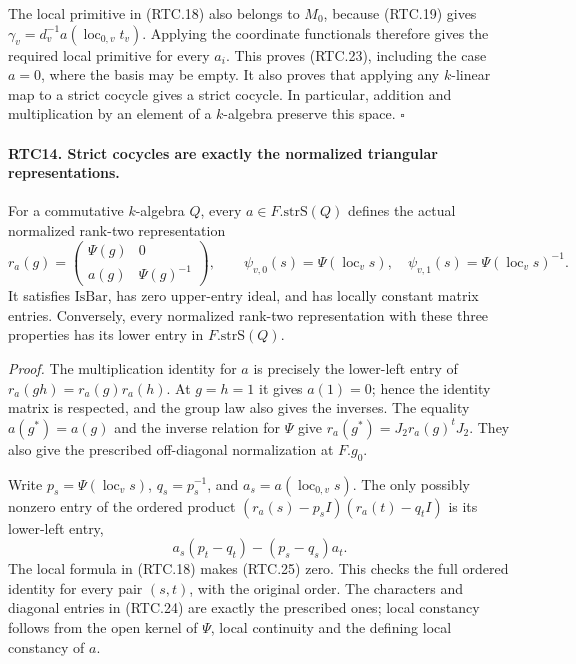 The local primitive in (RTC.18) also belongs to \(M_0\), because
(RTC.19) gives
\(\gamma_v=d_v^{-1}a(\operatorname{loc}_{0,v}t_v)\).
Applying the coordinate functionals therefore gives the required
local primitive for every \(a_i\).  This proves (RTC.23), including
the case \(a=0\), where the basis may be empty.  It also proves
that applying any \(k\)-linear map to a strict cocycle gives a
strict cocycle.  In particular, addition and multiplication by an
element of a \(k\)-algebra preserve this space. \hfill\(\square\)

\paragraph{RTC14. Strict cocycles are exactly the normalized triangular representations.}
\label{claim:RTC14}
For a commutative \(k\)-algebra \(Q\), every
\(a\in F.\mathrm{strS}(Q)\) defines the actual normalized
rank-two representation
\[
 r_a(g)=
 \begin{pmatrix}\Psi(g)&0\\a(g)&\Psi(g)^{-1}\end{pmatrix},
 \qquad
 \psi_{v,0}(s)=\Psi(\operatorname{loc}_v s),\quad
 \psi_{v,1}(s)=\Psi(\operatorname{loc}_v s)^{-1}.
                                                        \tag{RTC.24}
\]
It satisfies \(\mathrm{IsBar}\), has zero upper-entry ideal,
and has locally constant matrix entries.  Conversely, every normalized
rank-two representation with these three properties has its lower
entry in \(F.\mathrm{strS}(Q)\).

\emph{Proof.}
The multiplication identity for \(a\) is precisely the lower-left
entry of \(r_a(gh)=r_a(g)r_a(h)\).  At \(g=h=1\) it gives
\(a(1)=0\); hence the identity matrix is respected, and the
group law also gives the inverses.  The equality
\(a(g^*)=a(g)\) and the inverse relation for \(\Psi\) give
\(r_a(g^*)=J_2r_a(g)^tJ_2\).  They also give the prescribed
off-diagonal normalization at \(F.g_0\).

Write \(p_s=\Psi(\operatorname{loc}_v s)\),
\(q_s=p_s^{-1}\), and \(a_s=a(\operatorname{loc}_{0,v}s)\).
The only possibly nonzero entry of the ordered product
\((r_a(s)-p_sI)(r_a(t)-q_tI)\) is its lower-left entry,
\[
 a_s(p_t-q_t)-(p_s-q_s)a_t.
                                                        \tag{RTC.25}
\]
The local formula in (RTC.18) makes (RTC.25) zero.  This checks
the full ordered identity for every pair \((s,t)\), with the
original order.  The characters and diagonal entries in (RTC.24)
are exactly the prescribed ones; local constancy follows from the
open kernel of \(\Psi\), local continuity and the defining
local constancy of \(a\).

